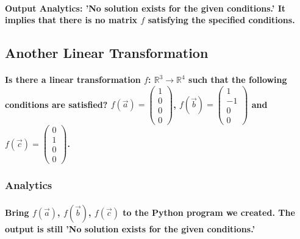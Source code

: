 \paragraph{\textbf{Output Analytics: 'No solution exists for the given conditions.'}  It implies that there is no matrix $f$ satisfying the specified conditions.}
% 
% 
% 
% 

\subsection{Another Linear Transformation}
\paragraph{Is there a linear transformation $f$: $\mathbb{R}^{3} \rightarrow \mathbb{R}^{4}$ such that the following conditions are satisfied?
    $ f(\vec{a})= \begin{pmatrix}
            1 \\
            0 \\
            0 \\
            0
        \end{pmatrix}$,
    $ f(\vec{b})= \begin{pmatrix}
            1  \\
            -1 \\
            0  \\
            0
        \end{pmatrix}$ and
    $ f(\vec{c})= \begin{pmatrix}
            0 \\
            1 \\
            0 \\
            0
        \end{pmatrix}$.}
\subsubsection{Analytics}
\paragraph{Bring $f(\vec{a})$, $f(\vec{b})$, $f(\vec{c})$ to the Python program we created. The output is still \textbf{'No solution exists for the given conditions.'}}